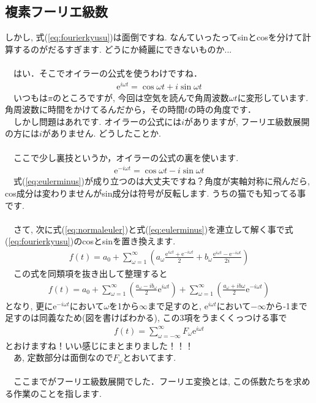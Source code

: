 \documentclass[11pt,a4paper]{ujreport} 	%
\begin{document}
\subsection{複素フーリエ級数}
しかし, 式(\ref{eq:fourierkyusu})は面倒ですね. なんていったってsinとcosを分けて計算するのがだるすぎます. どうにか綺麗にできないものか...\\
\\
　はい．そこでオイラーの公式を使うわけですね．
\begin{eqnarray}
\mathrm{e}^{i\omega t} = \cos\omega t + i\sin\omega t
\label{eq:normaleuler}
\end{eqnarray}
　いつもは$\pi$のところですが, 今回は空気を読んで角周波数$\omega t$に変形しています. 角周波数に時間をかけてるんだから，その時間$t$の時の角度です．\\
　しかし問題はあれです. オイラーの公式には$i$がありますが, フーリエ級数展開の方には$i$がありません. どうしたことか.\\
\\
　ここで少し裏技というか，オイラーの公式の裏を使います.
\begin{eqnarray}
\mathrm{e}^{-i\omega t} = \cos\omega t - i\sin\omega t
\label{eq:eulerminus}
\end{eqnarray}
　式(\ref{eq:eulerminus})が成り立つのは大丈夫ですね？角度が実軸対称に飛んだら, cos成分は変わりませんがsin成分は符号が反転します. うちの猫でも知ってる事です.\\
\\
　さて, 次に式(\ref{eq:normaleuler})と式(\ref{eq:eulerminus})を連立して解く事で式(\ref{eq:fourierkyusu})のcosとsinを置き換えます. \\
\begin{eqnarray}
f(t) = a_0 + \sum_{\omega=1}^\infty {(a_\omega \frac{\mathrm{e}^{i\omega t}+\mathrm{e}^{-i\omega t}}{2} + b_\omega \frac{\mathrm{e}^{i\omega t} - \mathrm{e}^{-i\omega t}}{2i})}
\label{eq:complexfourier}
\end{eqnarray}
　この式を同類項を抜き出して整理すると
\begin{eqnarray}
f(t) = a_0 + \sum_{\omega=1}^\infty {(\frac{a_\omega - ib_\omega}{2}\mathrm{e}^{i\omega t})} + \sum_{\omega=1}^\infty {(\frac{a_\omega + ib\omega}{2}\mathrm{e}^{-i\omega t})}
\label{eq:complexfourierkai}
\end{eqnarray}
となり, 更に$\mathrm{e}^{-i\omega t}$において$\omega$を1から$\infty$まで足すのと, $\mathrm{e}^{i\omega t}$において$-\infty$から-1まで足すのは同義なため(図を書けばわかる), この3項をうまくくっつける事で
\begin{eqnarray}
f(t) = \sum_{\omega = -\infty}^\infty F_\omega \mathrm{e}^{i\omega t}
\end{eqnarray}
とおけますね！いい感じにまとまりました！！！\\
　あ, 定数部分は面倒なので$F_\omega$とおいてます. \\
\\
　ここまでがフーリエ級数展開でした．フーリエ変換とは, この係数たちを求める作業のことを指します. 
\end{document}
